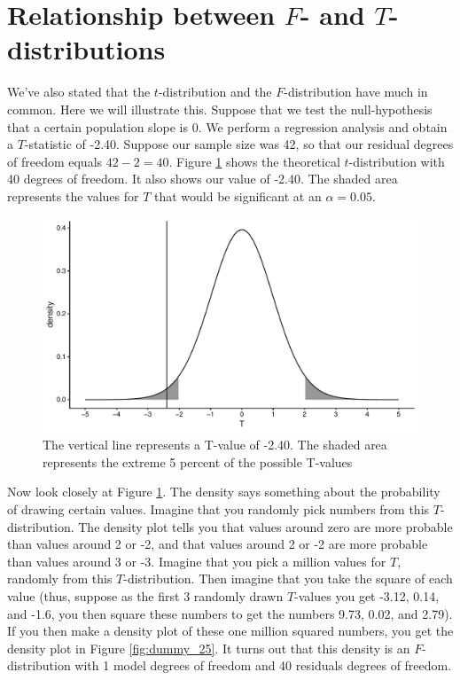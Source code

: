 \documentclass[]{book}\usepackage[]{graphicx}\usepackage[]{color}
\makeatletter
\def\maxwidth{ %
  \ifdim\Gin@nat@width>\linewidth
    \linewidth
  \else
    \Gin@nat@width
  \fi
}
\newenvironment{knitrout}{}{} %
\makeatother
\begin{document}
\section{Relationship between $F$- and $T$-distributions}

We've also stated that the $t$-distribution and the $F$-distribution have much in common. Here we will illustrate this. Suppose that we test the null-hypothesis that a certain population slope is 0. We perform a regression analysis and obtain a $T$-statistic of -2.40. Suppose our sample size was 42, so that our residual degrees of freedom equals $42-2=40$. Figure \ref{fig:dummy_24} shows the theoretical $t$-distribution with 40 degrees of freedom. It also shows our value of -2.40. The shaded area represents the values for $T$ that would be significant at an $\alpha=0.05$.   


\begin{knitrout}
\color{fgcolor}\begin{figure}

{\centering \includegraphics[width=\maxwidth]{figure/dummy_24-1} 

}

\caption[The vertical line represents a T-value of -2.40]{The vertical line represents a T-value of -2.40. The shaded area represents the extreme 5 percent of the possible T-values}\label{fig:dummy_24}
\end{figure}


\end{knitrout}


Now look closely at Figure \ref{fig:dummy_24}. The density says something about the probability of drawing certain values. Imagine that you randomly pick numbers from this $T$-distribution. The density plot tells you that values around zero are more probable than values around 2 or -2, and that values around 2 or -2 are more probable than values around 3 or -3. Imagine that you pick a million values for $T$, randomly from this $T$-distribution. Then imagine that you take the square of each value (thus, suppose as the first 3 randomly drawn $T$-values you get -3.12, 0.14, and -1.6, you then square these numbers to get the numbers 9.73, 0.02, and 2.79). If you then make a density plot of these one million squared numbers, you get the density plot in Figure \ref{fig:dummy_25}. It turns out that this density is an $F$-distribution with 1 model degrees of freedom and 40 residuals degrees of freedom. 
\end{document}
